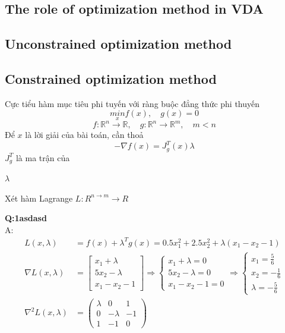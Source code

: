 \subsection{The role of optimization method in VDA}
\subsection{Unconstrained optimization method}



\subsection{Constrained optimization method}


Cực tiểu hàm mục tiêu phi tuyến với ràng buộc đẳng thức phi thuyến
\begin{equation*}
    \underset{x}{min} f(x) , \quad g(x) = 0
\end{equation*}
\begin{equation*}
    f: \mathbb{R}^n \rightarrow \mathbb{R}, \quad g: \mathbb{R}^n \rightarrow \mathbb{R}^m, \quad m < n
\end{equation*}
Để $x$ là lời giải của bài toán, cần thoả
\begin{equation*}
    -\nabla f(x) = J^T_g (x) \lambda
\end{equation*}
$J^T_g$ là ma trận của 

$\lambda$

Xét hàm Lagrange $L: R^{n\rightarrow m}\rightarrow R$


\textbf{Q:1asdasd }\\
A: \begin{align*}
    L (x, \lambda) &= f(x) + \lambda^Tg(x) = 0.5x_1^2 + 2.5x_2^2 + \lambda(x_1-x_2-1)\\
    \nabla L (x, \lambda) &= \begin{bmatrix}
        x_1 + \lambda\\
        5x_2 - \lambda\\
        x_1 - x_2 - 1
    \end{bmatrix}\Rightarrow \begin{cases}
        x_1 + \lambda = 0\\
        5x_2 - \lambda = 0\\
        x_1 - x_2 - 1 = 0
    \end{cases} \Rightarrow \begin{cases}
        x_1 = \frac{5}{6}\\
        x_2 = -\frac{1}{6}\\
        \lambda = -\frac{5}{6}
    \end{cases}\\
    \nabla^2 L (x, \lambda) &= \begin{pmatrix}
        \lambda & 0 & 1\\
        0 & -\lambda & -1\\
        1 & -1 & 0
    \end{pmatrix}\\
\end{align*}

